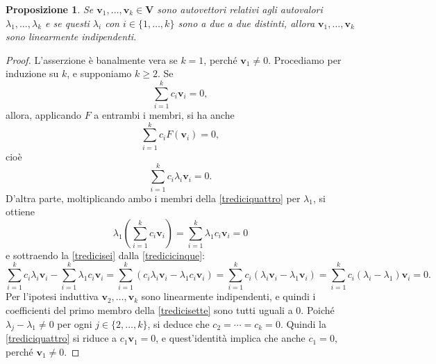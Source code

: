 \documentclass{article}
\theoremstyle{plain}
\newtheorem{prop}[thm]{Proposizione}
\theoremstyle{definition}
\theoremstyle{remark}
\begin{document}
\begin{bxthm}
\begin{prop}\label{quelloserio}
Se $\mathbf{v}_1, \dots, \mathbf{v}_k \in \mathbf{V}$ sono autovettori relativi agli autovalori $\lambda_1, \dots, \lambda_k$ e se questi $\lambda_i$ con $i\in\{1,\ldots,k\}$
sono a due a due distinti, allora $\mathbf{v}_1, \dots, \mathbf{v}_k$ sono linearmente indipendenti.
\end{prop}
\end{bxthm}
\begin{proof}
L'asserzione è banalmente vera se $k = 1$, perché $\mathbf{v}_1 \neq 0$. 
Procediamo per induzione su $k$, e supponiamo $k \geq 2$. Se
\begin{equation}\label{trediciquattro}
\sum_{i=1}^{k}c_i\mathbf{v}_i=0, 
\end{equation}
allora, applicando $F$ a entrambi i membri, si ha anche
\[
\sum_{i=1}^{k}c_iF(\mathbf{v}_i)=0,
\]
cioè
\begin{equation}\label{tredicicinque}
\sum_{i=1}^{k}c_i\lambda_i\mathbf{v}_i=0.
\end{equation}
D'altra parte, moltiplicando ambo i membri della \ref{trediciquattro} per $\lambda_1$, si ottiene
\begin{equation}\label{tredicisei}
    \lambda_1\left(\sum_{i=1}^{k}c_i\mathbf{v}_i\right)=\sum_{i=1}^{k}\lambda_1c_i\mathbf{v}_i=0
\end{equation}
e sottraendo la \ref{tredicisei} dalla \ref{tredicicinque}:
\begin{equation}\label{tredicisette}
    \sum_{i=1}^{k}c_i\lambda_i\mathbf{v}_i-\sum_{i=1}^{k}\lambda_1c_i\mathbf{v}_i=\sum_{i=1}^{k}\left(c_i\lambda_i\mathbf{v}_i-\lambda_1c_i\mathbf{v}_i\right)=\sum_{i=1}^{k}c_i\left(\lambda_i\mathbf{v}_i-\lambda_1\mathbf{v}_i\right)=\sum_{i=1}^{k}c_i\left(\lambda_i-\lambda_1\right)\mathbf{v}_i=0.
\end{equation}
Per l'ipotesi induttiva $\mathbf{v}_2, \ldots, \mathbf{v}_k$ sono linearmente indipendenti, e quindi i coefficienti del primo membro della 
\ref{tredicisette} sono tutti uguali a $0$. Poiché $\lambda_j - \lambda_1 \neq 0$ per ogni $j\in\{2,\ldots,k\}$, si deduce che 
$c_2 = \cdots = c_k = 0$. Quindi la \ref{trediciquattro} si riduce a $c_1 \mathbf{v}_1 = 0$, e quest'identità implica 
che anche $c_1 = 0$, perché $\mathbf{v}_1 \neq 0$.    
\end{proof}

\vspace{10pt}
\end{document}
